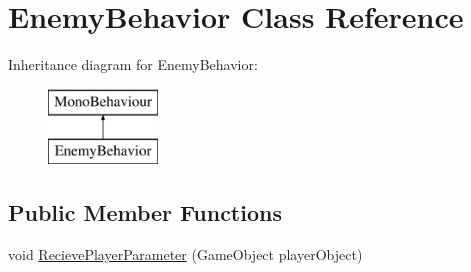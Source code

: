 \hypertarget{class_enemy_behavior}{}\section{Enemy\+Behavior Class Reference}
\label{class_enemy_behavior}
Inheritance diagram for Enemy\+Behavior\+:\begin{figure}[H]
\begin{center}
\leavevmode
\includegraphics[height=2.000000cm]{class_enemy_behavior}
\end{center}
\end{figure}
\subsection*{Public Member Functions}
\begin{DoxyCompactItemize}
\item 
void \mbox{\hyperlink{class_enemy_behavior_a1a0d6efe8ce9e53a0e4bddd06c379097}{Recieve\+Player\+Parameter}} (Game\+Object player\+Object)
\end{DoxyCompactItemize}
